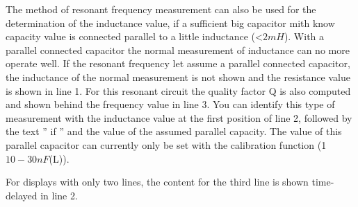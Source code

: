 The method of resonant frequency measurement can also be used for the determination of the inductance value,
if a sufficient big capacitor mith know capacity value is connected parallel to a little inductance (\textless\(2mH\)).
With a parallel connected capacitor the normal measurement of inductance can no more operate well.
If the resonant frequency let assume a parallel connected capacitor, the inductance of the normal measurement
is not shown and the resistance value is shown in line 1.
For this resonant circuit the quality factor Q is also computed and shown behind the frequency value in line 3.
You can identify this type of measurement with the inductance value at the first position of line 2,
followed by the text '' if '' and the value of the assumed parallel capacity.
The value of this parallel capacitor can currently only be set with the calibration function (\mbox{1  \(10-30nF\)(L)}).

For displays with only two lines, the content for the third line is shown time-delayed in line 2.
